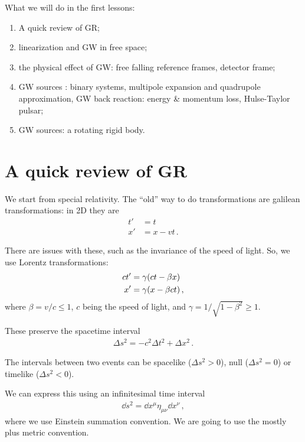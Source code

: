 \documentclass[main.tex]{subfiles}
\begin{document}

What we will do in the first lessons: 
\begin{enumerate}
  \item A quick review of GR;
  \item linearization and GW in free space;
  \item the physical effect of GW: free falling reference frames, detector frame;
  \item GW sources : binary systems, multipole expansion and quadrupole approximation, GW back reaction: energy \& momentum loss, Hulse-Taylor pulsar;
  \item GW sources: a rotating rigid body.
\end{enumerate}

\section{A quick review of GR}

We start from special relativity. 
The ``old'' way to do transformations are galilean transformations: in 2D they are
%
\begin{align}
t' &= t  \\
x' &= x - vt
\,.
\end{align}

There are issues with these, such as the invariance of the speed of light. So, we use Lorentz transformations: 
%
\begin{align}
ct' &= \gamma \qty(ct - \beta x)  \\
x' &= \gamma \qty(x - \beta ct)
\,,
\end{align}
%
where \(\beta = v/c \leq 1\), \(c\) being the speed of light, and \(\gamma = 1/\sqrt{1 - \beta^2} \geq 1\). 

These preserve the spacetime interval 
%
\begin{align}
\Delta s^2 = - c^2 \Delta t^2 + \Delta x^2
\,.
\end{align}

The intervals between two events can be spacelike (\(\Delta s^2 > 0\)), null (\(\Delta s^2 = 0\)) or timelike (\(\Delta s^2 < 0\)). 

We can express this using an infinitesimal time interval  
%
\begin{align}
\dd{s^2} = \dd{x^{\mu }} \eta_{\mu \nu  } \dd{x^{\nu }}
\,,
\end{align}
%
where we use Einstein summation convention. 
We are going to use the mostly plus metric convention. 
\end{document}

